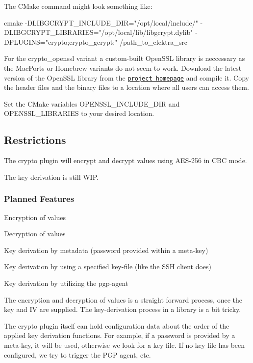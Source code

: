 The C\+Make command might look something like\+: \begin{DoxyVerb}    cmake -DLIBGCRYPT_INCLUDE_DIR="/opt/local/include/" -DLIBGCRYPT_LIBRARIES="/opt/local/lib/libgcrypt.dylib" -DPLUGINS="crypto;crypto_gcrypt;" /path_to_elektra_src
\end{DoxyVerb}


For the {\ttfamily crypto\+\_\+openssl} variant a custom-\/built Open\+S\+S\+L library is neccessary as the Mac\+Ports or Homebrew variants do not seem to work. Download the latest version of the Open\+S\+S\+L library from the \href{https://www.openssl.org/source/}{\tt project homepage} and compile it. Copy the header files and the binary files to a location where all users can access them.

Set the C\+Make variables {\ttfamily O\+P\+E\+N\+S\+S\+L\+\_\+\+I\+N\+C\+L\+U\+D\+E\+\_\+\+D\+I\+R} and {\ttfamily O\+P\+E\+N\+S\+S\+L\+\_\+\+L\+I\+B\+R\+A\+R\+I\+E\+S} to your desired location.

\subsection*{Restrictions}

The crypto plugin will encrypt and decrypt values using A\+E\+S-\/256 in C\+B\+C mode.

The key derivation is still W\+I\+P.

\subsubsection*{Planned Features}


\begin{DoxyItemize}
\item Encryption of values
\item Decryption of values
\item Key derivation by metadata (password provided within a meta-\/key)
\item Key derivation by using a specified key-\/file (like the S\+S\+H client does)
\item Key derivation by utilizing the pgp-\/agent
\end{DoxyItemize}

The encryption and decryption of values is a straight forward process, once the key and I\+V are supplied. The key-\/derivation process in a library is a bit tricky.

The crypto plugin itself can hold configuration data about the order of the applied key derivation functions. For example, if a password is provided by a meta-\/key, it will be used, otherwise we look for a key file. If no key file has been configured, we try to trigger the P\+G\+P agent, etc.


